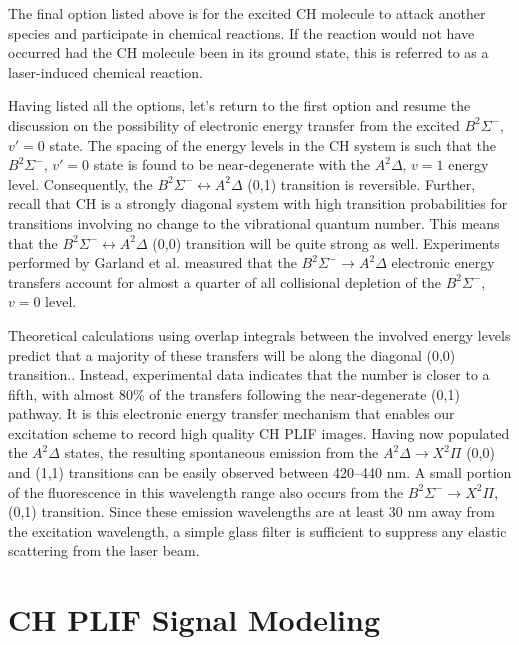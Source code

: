 The final option listed above is for the excited CH molecule to attack another species and participate in chemical reactions.
If the reaction would not have occurred had the CH molecule been in its ground state, this is referred to as a laser-induced chemical reaction.

Having listed all the options, let's return to the first option and resume the discussion on the possibility of electronic energy transfer from the excited \(B^2\Sigma^-\), \(v'=0\) state.
The spacing of the energy levels in the CH system is such that the \(B^2\Sigma^-\), \(v'=0\) state is found to be near-degenerate with the \(A^2\Delta\), \(v=1\) energy level.
Consequently, the \(B^2\Sigma^-\leftrightarrow A^2\Delta\) (0,1) transition is reversible.
Further, recall that CH is a strongly diagonal system with high transition probabilities for transitions involving no change to the vibrational quantum number.
This means that the \(B^2\Sigma^-\leftrightarrow A^2\Delta\) (0,0) transition will be quite strong as well.
Experiments performed by Garland et al.\cite{1985-garland-b} measured that the \(B^2\Sigma^-\rightarrow A^2\Delta\) electronic energy transfers account for almost a quarter of all collisional depletion of the \(B^2\Sigma^-\), \(v=0\) level.

Theoretical calculations using overlap integrals between the involved energy levels predict that a majority of these transfers will be along the diagonal (0,0) transition.\cite{2000-luque}.
Instead, experimental data indicates that the number is closer to a fifth, with almost 80\% of the transfers following the near-degenerate (0,1) pathway.
It is this electronic energy transfer mechanism that enables our excitation scheme to record high quality CH PLIF images.
Having now populated the \(A^2\Delta\) states, the resulting spontaneous emission from the \(A^2\Delta\rightarrow X^2\Pi\) (0,0) and (1,1) transitions can be easily observed between 420--440 nm.
A small portion of the fluorescence in this wavelength range also occurs from the \(B^2\Sigma^-\rightarrow X^2\Pi\), (0,1) transition.
Since these emission wavelengths are at least 30 nm away from the excitation wavelength, a simple glass filter is sufficient to suppress any elastic scattering from the laser beam.

\section{CH PLIF Signal Modeling}
\label{sec:chplifsignalmodel}

